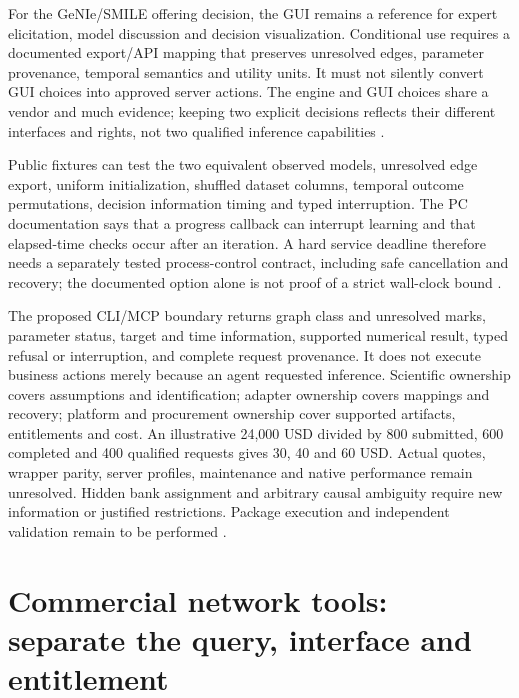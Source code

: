 For the GeNIe/SMILE offering decision, the GUI remains a reference for expert
elicitation, model discussion and decision visualization. Conditional use
requires a documented export/API mapping that preserves unresolved edges,
parameter provenance, temporal semantics and utility units. It must not
silently convert GUI choices into approved server actions. The engine and
GUI choices share a vendor and much evidence; keeping two explicit
decisions reflects their different interfaces and rights, not two qualified
inference capabilities \cite{exec24_smile_choice}.

Public fixtures can test the two equivalent observed models, unresolved
edge export, uniform initialization, shuffled dataset columns, temporal
outcome permutations, decision information timing and typed interruption.
The PC documentation says that a progress callback can interrupt learning
and that elapsed-time checks occur after an iteration. A hard service
deadline therefore needs a separately tested process-control contract,
including safe cancellation and recovery; the documented option alone is
not proof of a strict wall-clock bound
\cite{exec13_smile_pc,exec24_smile_choice}.

The proposed CLI/MCP boundary returns graph class and unresolved marks,
parameter status, target and time information, supported numerical result,
typed refusal or interruption, and complete request provenance. It does
not execute business actions merely because an agent requested inference.
Scientific ownership covers assumptions and identification; adapter
ownership covers mappings and recovery; platform and procurement ownership
cover supported artifacts, entitlements and cost. An illustrative
24,000 USD divided by 800 submitted, 600 completed and 400 qualified
requests gives 30, 40 and 60 USD. Actual quotes, wrapper parity, server
profiles, maintenance and native performance remain unresolved. Hidden
bank assignment and arbitrary causal ambiguity require new information or
justified restrictions. Package execution and independent validation remain to be performed \cite{exec24_smile_choice}.


\section{Commercial network tools: separate the query, interface and entitlement}
\label{sec:exec25-bn-commercial-reuse}

